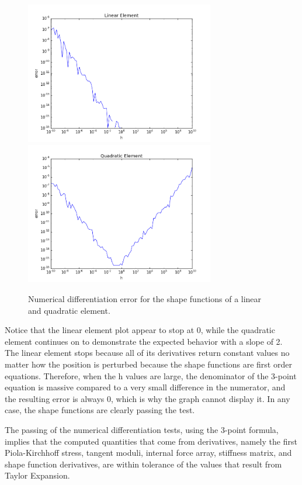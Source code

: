 \documentclass[]{spie}  %
\begin{document}
\begin{figure}[h]
	\centering
	\includegraphics[width=3.25in]{shape_function_error_linear.png} \quad
	\includegraphics[width=3.25in]{shape_function_error_quadratic.png} 
	\caption{Numerical differentiation error for the shape functions of a linear and quadratic element.} 
	\label{fig: numerical differentiation error, shape functions}
\end{figure}

Notice that the linear element plot appear to stop at 0, while the quadratic element continues on to demonstrate the expected behavior with a slope of 2. The linear element stops because all of its derivatives return constant values no matter how the position is perturbed because the shape functions are first order equations. Therefore, when the h values are large, the denominator of the 3-point equation is massive compared to a very small difference in the numerator, and the resulting error is always 0, which is why the graph cannot display it. In any case, the shape functions are clearly passing the test. 

The passing of the numerical differentiation tests, using the 3-point formula, implies that the computed quantities that come from derivatives, namely the first Piola-Kirchhoff stress, tangent moduli, internal force array, stiffness matrix, and shape function derivatives, are within tolerance of the values that result from Taylor Expansion. 
\end{document}
